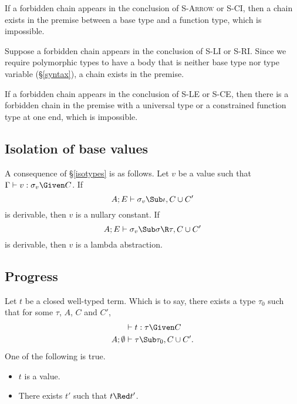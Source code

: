 If a forbidden chain appears in the conclusion of
\textsc{S-Arrow} or \textsc{S-CI}, then a chain exists in the
premise between a base type and a function type, which is
impossible.

Suppose a forbidden chain appears in the conclusion of
\textsc{S-LI} or \textsc{S-RI}. Since we require polymorphic
types to have a body that is neither base type nor type variable
(\S\ref{syntax}), a chain exists in the premise.

If a forbidden chain appears in the conclusion of \textsc{S-LE}
or \textsc{S-CE}, then there is a forbidden chain in the premise
with a universal type or a constrained function type at one end,
which is impossible.

\subsection{Isolation of base values}
\label{isovalues}
A consequence of \S\ref{isotypes} is as follows. Let $v$ be a
value such that $\Gamma\vdash v:\sigma_v\Given C$. If
\[
A;E\vdash \sigma_v\Sub\iota,C\cup C'
\]
is derivable, then $v$ is a nullary constant. If
\[
A;E\vdash \sigma_v\Sub\sigma\R\tau,C\cup C'
\]
is derivable, then $v$ is a lambda abstraction.

\subsection{Progress} Let $t$ be a closed well-typed term. Which
is to say, there exists a type $\tau_0$ such that for some
$\tau$, $A$, $C$ and $C'$,
\begin{align*}
&\vdash t:\tau\Given C\\
A;\emptyset&\vdash \tau\Sub\tau_0,C\cup C'.
\end{align*}
One of the following is true.
\begin{itemize}
\item $t$ is a value.
\item There exists $t'$ such that $t\Red t'$.
\end{itemize}

